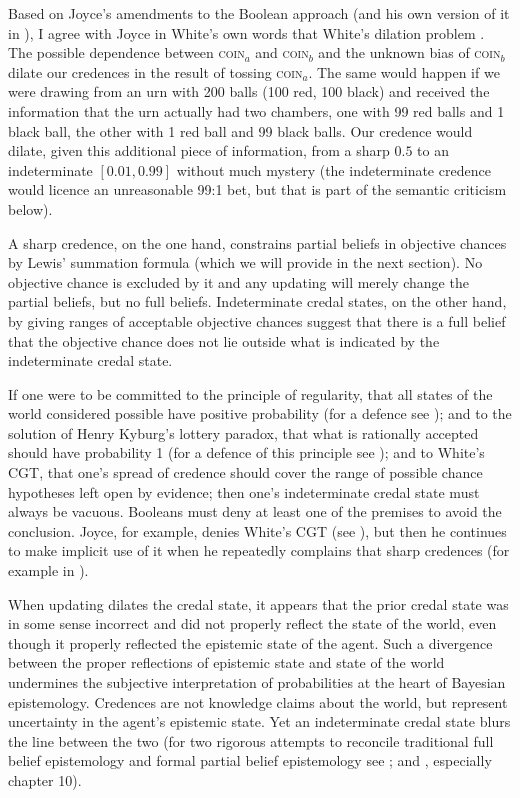 Based on Joyce's amendments to the Boolean approach
(and his own version of it in ), I
agree with Joyce in White's own words that White's
dilation problem 
. The possible dependence
between \textsc{coin}$_{a}$ and \textsc{coin}$_{b}$ and
the unknown bias of \textsc{coin}$_{b}$ dilate our
credences in the result of tossing \textsc{coin}$_{a}$.
The same would happen if we were drawing from an urn
with 200 balls (100 red, 100 black) and received the
information that the urn actually had two chambers, one
with 99 red balls and 1 black ball, the other with 1
red ball and 99 black balls. Our credence would dilate,
given this additional piece of information, from a
sharp $0.5$ to an indeterminate $[0.01,0.99]$ without
much mystery (the indeterminate credence would licence
an unreasonable 99:1 bet, but that is part of the
semantic criticism below).

A sharp credence, on the one hand, constrains partial
beliefs in objective chances by Lewis' summation
formula (which we will provide in the next section). No
objective chance is excluded by it and any updating
will merely change the partial beliefs, but no full
beliefs. Indeterminate credal states, on the other
hand, by giving ranges of acceptable objective chances
suggest that there is a full belief that the objective
chance does not lie outside what is indicated by the
indeterminate credal state.

If one were to be committed to the principle of
regularity, that all states of the world considered
possible have positive probability (for a defence see
); and to the solution of
Henry Kyburg's lottery paradox, that what is rationally
accepted should have probability 1 (for a defence of
this principle see );
and to White's CGT, that one's spread of credence
should cover the range of possible chance hypotheses
left open by evidence; then one's indeterminate credal
state must always be vacuous. Booleans must deny at
least one of the premises to avoid the conclusion.
Joyce, for example, denies White's CGT (see
), but then he continues to make
implicit use of it when he repeatedly complains that
sharp credences  (for example in ).

When updating dilates the credal state, it appears that
the prior credal state was in some sense incorrect and
did not properly reflect the state of the world, even
though it properly reflected the epistemic state of the
agent. Such a divergence between the proper reflections
of epistemic state and state of the world undermines
the subjective interpretation of probabilities at the
heart of Bayesian epistemology. Credences are not
knowledge claims about the world, but represent
uncertainty in the agent's epistemic state. Yet an
indeterminate credal state blurs the line between the
two (for two rigorous attempts to reconcile traditional
full belief epistemology and formal partial belief
epistemology see ; and
, especially chapter 10).


